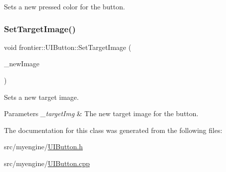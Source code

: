 Sets a new pressed color for the button. 

\mbox{\label{classfrontier_1_1_u_i_button_acb2814a6d4a6303ad8606f7ae01e3f3d}} 
\subsubsection{\texorpdfstring{Set\+Target\+Image()}{SetTargetImage()}}
{\footnotesize\ttfamily void frontier\+::\+U\+I\+Button\+::\+Set\+Target\+Image (\begin{DoxyParamCaption}\item[{std\+::weak\+\_\+ptr$<$ \hyperlink{classfrontier_1_1_u_i_image}{U\+I\+Image} $>$}]{\+\_\+new\+Image }\end{DoxyParamCaption})}



Sets a new target image. 


\begin{DoxyParams}{Parameters}
{\em \+\_\+target\+Img} & The new target image for the button. \\
\hline
\end{DoxyParams}


The documentation for this class was generated from the following files\+:\begin{DoxyCompactItemize}
\item 
src/myengine/\hyperlink{_u_i_button_8h}{U\+I\+Button.\+h}\item 
src/myengine/\hyperlink{_u_i_button_8cpp}{U\+I\+Button.\+cpp}\end{DoxyCompactItemize}
